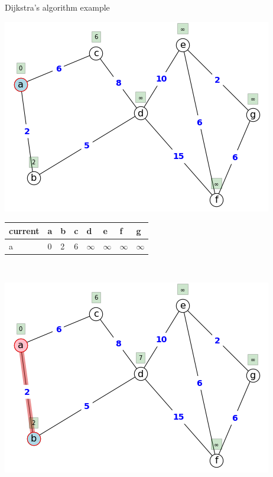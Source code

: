 \begin{example}{Dijkstra's algorithm example}{}
\begin{minipage}{0.5\textwidth}
\includegraphics[scale = 0.5]{graph-theory-graphics/dijkstra1.png}
\end{minipage}
\begin{minipage}{0.5\textwidth}
         \begin{tabular}{|l|l|l|l|l|l|l|l|}
    \hline
        current & a & b & c & d & e & f & g \\ \hline
        a & 0 & 2 & 6 & $\infty$ & $\infty$ & $\infty$& $\infty$  \\ \hline
    \end{tabular} 
    \end{minipage}\\
\begin{minipage}{0.5\textwidth}
\includegraphics[scale = 0.5]{graph-theory-graphics/dijkstra2.png}
\end{minipage}
\begin{minipage}{0.5\textwidth}

\end{minipage}
\end{example}
